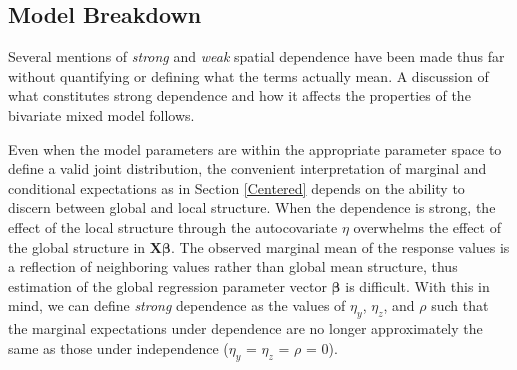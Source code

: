 \documentclass[12pt, a4paper, twoside]{article}
\begin{document}
\subsection{Model Breakdown} \label{breakdown}
Several mentions of \textit{strong} and \textit{weak} spatial dependence have been made thus far without quantifying or defining what the terms actually mean. A discussion of what constitutes strong dependence and how it affects the properties of the bivariate mixed model follows.

Even when the model parameters are within the appropriate parameter space to define a valid joint distribution, the convenient interpretation of marginal and conditional expectations as in Section \ref{Centered} depends on the ability to discern between global and local structure. When the dependence is strong, the effect of the local structure through the autocovariate $\eta$ overwhelms the effect of the global structure in $\boldsymbol{X\beta}$. The observed marginal mean of the response values is a reflection of neighboring values rather than global mean structure, thus estimation of the global regression parameter vector $\boldsymbol{\beta}$ is difficult. With this in mind, we can define \textit{strong} dependence as the values of $\eta_y$, $\eta_z$, and $\rho$ such that the marginal expectations under dependence are no longer approximately the same as those under independence ($\eta_y$ = $\eta_z$ = $\rho$ = 0).
\end{document}

